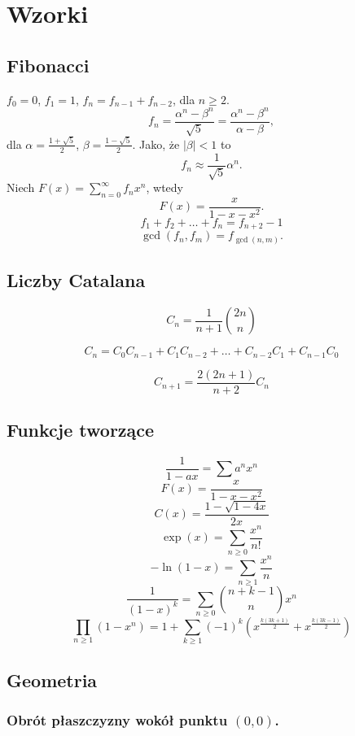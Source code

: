 \chapter{Wzorki}

\section{Fibonacci}
$f_0 = 0$, $f_1 = 1$, $f_n = f_{n-1} + f_{n-2}$, dla $n \geq 2$.
\vspace{0.4cm}
\[ f_n = \frac{\alpha^n - \beta ^n}{\sqrt{5}} = \frac{\alpha ^ n - \beta ^ n}{\alpha - \beta}, \]
dla $\alpha = \frac{1 + \sqrt{5}}{2}$, $\beta = \frac{1 - \sqrt{5}}{2}$.
Jako, że $|\beta| < 1$ to 
\[ f_n \approx \frac{1}{\sqrt{5}} \alpha ^ n.\]
Niech $F(x) = \sum_{n=0}^{\infty} f_n x^n$, wtedy 
\[ F(x) = \frac{x}{1 - x - x^2}. \]
\vspace{0.5cm}
\[f_1 + f_2 + \dots + f_n = f_{n+2} - 1\]
\[\gcd(f_n, f_m) = f_{\gcd(n, m)}. \]

\section{Liczby Catalana}
\[C_n = \frac{1}{n+1} \binom{2n}{n} \]

\[C_n = C_0 C_{n-1} + C_1 C_{n-2} + \ldots + C_{n-2} C_1 + C_{n-1} C_0 \]

\[C_{n+1} = \frac{2\left(2n +1 \right)}{n+2}C_n \]

\section{Funkcje tworzące}

\[ \frac{1}{1-ax} = \sum a^n x^n \]
\[F(x) = \frac{x}{1 - x - x^2} \]
\[ C(x) = \frac{1 - \sqrt{1-4x}}{2x} \]
\[ \exp(x) = \sum_{n \geq 0} \frac{x^n}{n!} \]
\[ -\ln(1-x) = \sum_{n \geq 1} \frac{x^n}{n} \]
\[ \frac{1}{(1-x)^k} = \sum_{n \geq 0} \binom{n+k-1}{n} x^n \]
\[ \prod_{n \geq 1} (1 - x^n) = 1 + \sum_{k \geq 1} (-1)^k \left( x^{\frac{k(3k+1)}{2}} + x ^{\frac{k(3k-1)}{2}} \right) \]

\section{Geometria}

\subsection{Obrót płaszczyzny wokół punktu $(0, 0)$.}

